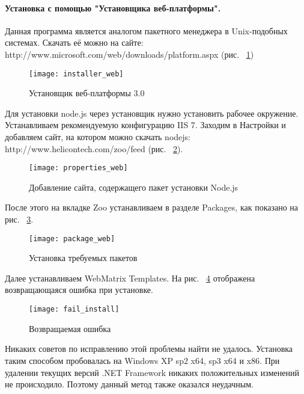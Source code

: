 \paragraph{Установка с помощью "Установщика веб-платформы".}
Данная программа является аналогом пакетного менеджера в Unix-подобных системах. Скачать её можно на сайте:\\
 http://www.microsoft.com/web/downloads/platform.aspx (рис. ~\ref{installer_web})
\begin{figure}[!ht]
	\begin{center}
		\texttt{[image: installer\_web]}
	\end{center}
	\caption{Установщик веб-платформы 3.0}
	\label{installer_web}
\end{figure}
Для установки node.js через установщик нужно установить рабочее окружение. 
Устанавливаем рекомендуемую конфигурацию IIS 7. 
Заходим в Настройки и добавляем сайт, на котором можно скачать nodejs: \\ http://www.helicontech.com/zoo/feed (рис. ~\ref{properties_web}).
\begin{figure}[!ht]
	\begin{center}
		\texttt{[image: properties\_web]}
	\end{center}
	\caption{Добавление сайта, содержащего пакет установки Node.js}
	\label{properties_web}
\end{figure}
После этого на вкладке Zoo устанавливаем в разделе Packages, как показано на рис. ~\ref{package_web}.
\begin{figure}[!ht]
	\begin{center}
		\texttt{[image: package\_web]}
	\end{center}
	\caption{Установка требуемых пакетов}
	\label{package_web}
\end{figure}
Далее устанавливаем WebMatrix Templates. На рис. ~\ref{fail_install} отображена возвращающаяся ошибка при установке.
\begin{figure}[!ht]
	\begin{center}
		\texttt{[image: fail\_install]}
	\end{center}
	\caption{Возвращаемая ошибка}
	\label{fail_install}
\end{figure}
Никаких советов по исправлению этой проблемы найти не удалось. Установка таким способом пробовалась на Windows XP sp2 x64, sp3 x64 и x86. При удалении текущих версий .NET Framework никаких положительных изменений не происходило.  
Поэтому данный метод  также оказался неудачным.


